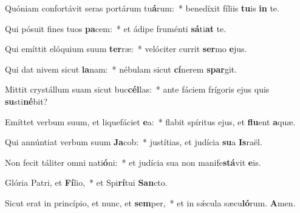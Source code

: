 ﻿\item Quóniam confortávit seras portárum tu\textbf{á}rum:~* benedíxit fíliis \textbf{tu}is \textbf{in} te.
\item Qui pósuit fines tuos \textbf{pa}cem:~* et ádipe fruménti \textbf{sá}ti\textbf{at} te.
\item Qui emíttit elóquium suum \textbf{ter}ræ:~* velóciter currit \textbf{ser}mo \textbf{e}jus.
\item Qui dat nivem sicut \textbf{la}nam:~* nébulam sicut \textbf{cí}nerem \textbf{spar}git.
\item Mittit crystállum suam sicut buc\textbf{cél}las:~* ante fáciem frígoris ejus quis \textbf{su}sti\textbf{né}bit?
\item Emíttet verbum suum, et liquefáciet \textbf{e}a:~* flabit spíritus ejus, et \textbf{flu}ent \textbf{a}quæ.
\item Qui annúntiat verbum suum \textbf{Ja}cob:~* justítias, et judícia \textbf{su}a \textbf{Is}raël.
\item Non fecit táliter omni nati\textbf{ó}ni:~* et judícia sua non manife\textbf{stá}vit \textbf{e}is.
\item Glória Patri, et \textbf{Fí}lio,~* et Spi\textbf{rí}tui \textbf{San}cto.
\item Sicut erat in princípio, et nunc, et \textbf{sem}per,~* et in sǽcula sæcu\textbf{ló}rum. \textbf{A}men.